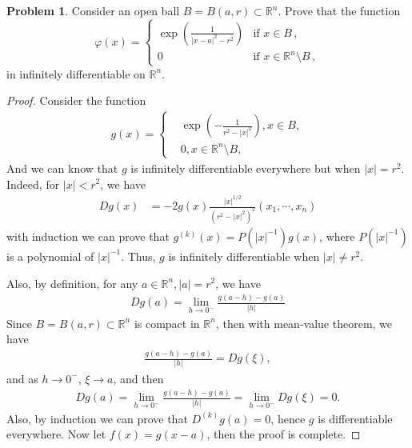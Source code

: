 \documentclass[11pt]{article}
\theoremstyle{definition}
\newtheorem{problem}{Problem}
\theoremstyle{definition}
\begin{document}
\medskip

\begin{problem}
Consider an open ball $B=B(a,r)\subset\mathbb{R}^n$. Prove that the function
$$
\varphi(x) = \left\{\begin{array}{ccc}
    \exp\left(\frac{1}{|x-a|^2-r^2}\right)       &  \mbox{if $x\in B$}\, , \\
    0     &  \mbox{if $x\in \mathbb{R}^n\setminus B$}\, ,
    \end{array}
    \right.
$$
in infinitely differentiable on $\mathbb{R}^n$.
\end{problem}

\begin{proof}
Consider the function 
\begin{align*}
    g(x) = \left\{
        \begin{aligned}
        & \exp \left(- \frac{1}{r^2 - |x|^2}\right), x\in B, \\
        & 0, x\in \mathbb{R}^n\setminus B,
        \end{aligned}
    \right.
\end{align*}
And we can know that $g$ is infinitely differentiable everywhere but when $|x| = r^2$. Indeed, for $|x| < r^2$, we have
\begin{align*}
    Dg(x) & = - 2 g(x) \frac{|x|^{1/2}}{(r^2 - |x|^2)^2} \left(x_1,\cdots,x_n \right)
\end{align*}
with induction we can prove that $g^{(k)}(x) = P\left(|x|^{-1}\right)g(x)$, where $P\left(|x|^{-1}\right)$ is a polynomial of $|x|^{-1}$. Thus, $g$ is infinitely differentiable when $|x| \neq r^2$.

Also, by definition, for any $a \in \mathbb{R}^n, |a| = r^2$, we have
\begin{align*}
    Dg(a) = \lim_{h\to 0^-} \frac{g(a - h) - g(a)}{|h|}
\end{align*}
Since $B = B(a,r)\subset\mathbb{R}^n$ is compact in $\mathbb{R}^n$, then with mean-value theorem, we have 
\begin{align*}
    \frac{g(a - h) - g(a)}{|h|} = Dg(\xi),
\end{align*}
and as $h\to 0^-$, $\xi \to a$, and then
\begin{align*}
    Dg(a) = \lim_{h\to 0^-} \frac{g(a - h) - g(a)}{|h|} = \lim_{h\to 0^-} Dg(\xi) = 0.
\end{align*}
Also, by induction we can prove that $D^{(k)}g(a) = 0$, hence $g$ is differentiable everywhere. Now let $f(x) = g(x-a)$, then the proof is complete.
\end{proof}
\end{document}
